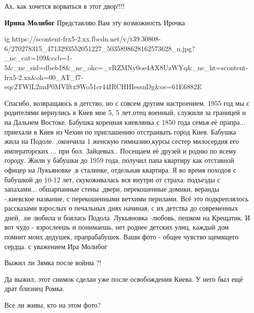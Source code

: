  
 
 
 
 

Ах, как хочется ворваться в этот двор!!!!

\textbf{Ирина Молибог} Представляю Вам эту возможность Ирочка

\ifcmt
  ig https://scontent-frx5-2.xx.fbcdn.net/v/t39.30808-6/270278315_4713293552051227_5035898628162573628_n.jpg?_nc_cat=109&ccb=1-5&_nc_sid=dbeb18&_nc_ohc=_vRZMNy0oe4AX8UzWYq&_nc_ht=scontent-frx5-2.xx&oh=00_AT_f7-eqc2TWlL2nnP0MVlftx9Wo51cr44IRCHHIessnDg&oe=61E6882E
\fi


Спасибо, возвращаюсь в детство, но с совсем другим настроением. 1955 год мы с
родителями вернулись в Киев мне 5, 5 лет,отец военный, служили за границей и на
Дальнем Востоке. Бабушка коренная киевлянка с 1850 года семья её прапра...
приехали в Киев из Чехии по приглашению отстраивать город Киев. Бабушка жила на
Подоле. ,окончила 1 женскую гимназию,курсы сестер милосердия его императорских
... при бол. Зайцевых.. Посещаем её друзей и родню по всему городу. Жили у
бабушки до 1959 года, получил папа квартиру как отставной офицер на Лукьяновке
,в сталинке, отдельная квартира. Я во время походов с бабушкой до 10-12 лет,
скукоживалась вся внутри от страха: подъезды с запахами... обшарпанные стены
,двери, перекошенные домики, веранды -,киевское название, с перекошенными
ветхими перилами. Всё это подкреплялось рассказами взрослых о печальных днях
начиная, с их детства до современных дней, .не любила и боялась Подола.
Лукьяновка -любовь, пешком на Крещатик. И вот чудо - взрослеешь и понимаешь,
нет роднее детских улиц, каждый дом помнит моих дедушек, прапрабабушек. Ваши
фото - общее чувство щемящего сердца. с уважением Ира Молибог

Выжил ли Зямка после войны ?!

Да выжил, этот снимок сделан уже после освобождения Киева. У него был ещё драт близнец Ромка.

Все ли живы, кто на этом фото?
